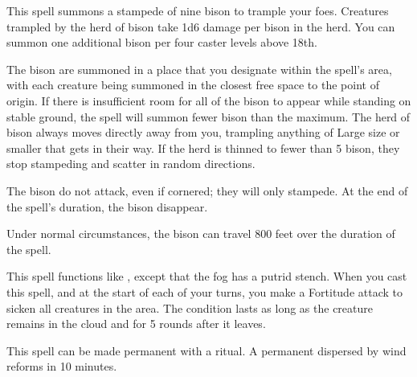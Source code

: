 \spelldur{\durshort \dismissable}
\begin{spelleffect}
    This spell summons a stampede of nine bison to trample your foes. Creatures trampled by the herd of bison take 1d6 damage per bison in the herd. You can summon one additional bison per four caster levels above 18th.
    \par The bison are summoned in a place that you designate within the spell's area, with each creature being summoned in the closest free space to the point of origin. If there is insufficient room for all of the bison to appear while standing on stable ground, the spell will summon fewer bison than the maximum. The herd of bison always moves directly away from you, trampling anything of Large size or smaller that gets in their way. If the herd is thinned to fewer than 5 bison, they stop stampeding and scatter in random directions.
    \par The bison do not attack, even if cornered; they will only stampede. At the end of the spell's duration, the bison disappear.
\end{spelleffect}
\begin{spellnotes}
    Under normal circumstances, the bison can travel 800 feet over the duration of the spell.
\end{spellnotes}

\begin{spelleffect}
    This spell functions like , except that the fog has a putrid stench. When you cast this spell, and at the start of each of your turns, you make a Fortitude attack to sicken all creatures in the area. The condition lasts as long as the creature remains in the cloud and for 5 rounds after it leaves.
\end{spelleffect}
\begin{spellnotes}
    This spell can be made permanent with a  ritual. A permanent  dispersed by wind reforms in 10 minutes.
\end{spellnotes}

